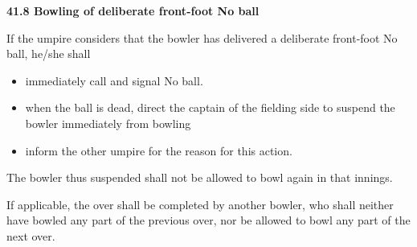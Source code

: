 \documentclass[12pt]{article}
\begin{document}
\vspace{\baselineskip}
{\fontsize{11pt}{13.2pt}\selectfont \textbf{41.8 \tabto{0.47in} Bowling of deliberate front-foot No ball}\par}\par


\vspace{\baselineskip}
{\fontsize{9pt}{10.8pt}\selectfont If the umpire considers that the bowler has delivered a deliberate front-foot No ball, he/she shall\par}\par


\vspace{\baselineskip}
\begin{itemize}
	\item {\fontsize{9pt}{10.8pt}\selectfont immediately call and signal No ball.\par}\par


\vspace{\baselineskip}
	\item {\fontsize{9pt}{10.8pt}\selectfont when the ball is dead, direct the captain of the fielding side to suspend the bowler immediately from bowling\par}\par


\vspace{\baselineskip}
	\item {\fontsize{9pt}{10.8pt}\selectfont inform the other umpire for the reason for this action.\par}
\end{itemize}\par


\vspace{\baselineskip}
{\fontsize{9pt}{10.8pt}\selectfont The bowler thus suspended shall not be allowed to bowl again in that innings.\par}\par


\vspace{\baselineskip}
\begin{adjustwidth}{0.0in}{0.12in}
{\fontsize{9pt}{10.8pt}\selectfont If applicable, the over shall be completed by another bowler, who shall neither have bowled any part of the previous over, nor be allowed to bowl any part of the next over.\par}\par

\end{adjustwidth}
\end{document}
